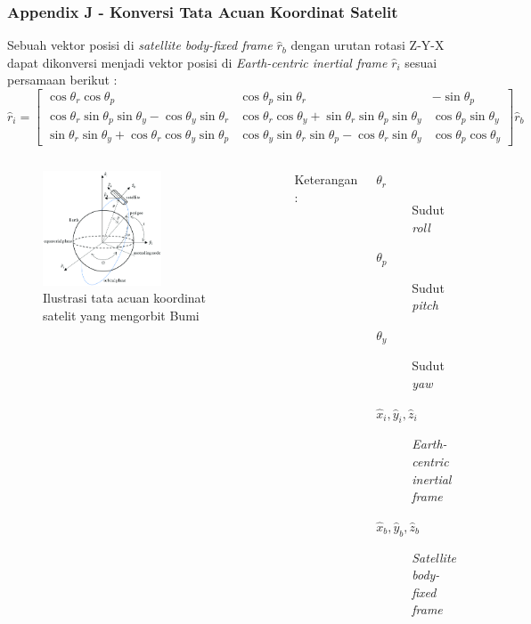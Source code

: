 \documentclass[8pt]{beamer}
\begin{document}
\begin{frame}
  \frametitle{Appendix J - Konversi Tata Acuan Koordinat Satelit}
    Sebuah vektor posisi di \textit{satellite body-fixed frame} $\hat{r}_b$ dengan urutan rotasi Z-Y-X dapat dikonversi menjadi vektor posisi di \textit{Earth-centric inertial frame} $\hat{r}_i$ sesuai persamaan berikut :
\begin{equation}
\label{eq:convert}
    \hat{r}_i = \begin{bmatrix}
      \cos{\theta_r}\cos{\theta_p} & \cos{\theta_p}\sin{\theta_r} & -\sin{\theta_p}\\
      \cos{\theta_r}\sin{\theta_p}\sin{\theta_y} - \cos{\theta_y}\sin{\theta_r} & \cos{\theta_r}\cos{\theta_y} + \sin{\theta_r}\sin{\theta_p}\sin{\theta_y} & \cos{\theta_p}\sin{\theta_y} \\
      \sin{\theta_r}\sin{\theta_y} + \cos{\theta_r}\cos{\theta_y}\sin{\theta_p} & \cos{\theta_y}\sin{\theta_r}\sin{\theta_p} - \cos{\theta_r}\sin{\theta_y} & \cos{\theta_p}\cos{\theta_y}
    \end{bmatrix} \hat{r}_b
\end{equation}
  \begin{columns}[T]
      \begin{figure}
          \includegraphics[width=0.6\textwidth]{figure/referenceframe.png}
            \caption{Ilustrasi tata acuan koordinat satelit yang mengorbit Bumi \cite{farissi2019}}
      \end{figure}
        \center Keterangan :
    \begin{description}
      \item[$\theta_r$] Sudut \textit{roll}
      \item[$\theta_p$] Sudut \textit{pitch}
      \item[$\theta_y$] Sudut \textit{yaw}
      \item[$\hat{x}_i, \hat{y}_i, \hat{z}_i$] \textit{Earth-centric inertial frame}
      \item[$\hat{x}_b, \hat{y}_b, \hat{z}_b$] \textit{Satellite body-fixed frame}
    \end{description}
  \end{columns}
\end{frame}
\end{document}
